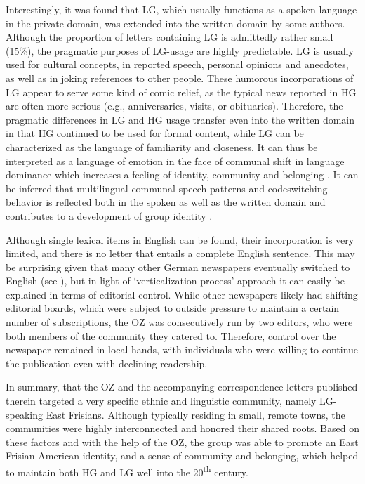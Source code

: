 \documentclass[output=paper]{langsci/langscibook}
\begin{document}
 
Interestingly, it was found that LG, which usually functions as a spoken language in the private domain, was extended into the written domain by some authors. Although the proportion of letters containing LG is admittedly rather small (15\%), the pragmatic purposes of LG-usage are highly predictable. LG is usually used for cultural concepts, in reported speech, personal opinions and anecdotes, as well as in joking references to other people. These humorous incorporations of LG appear to serve some kind of comic relief, as the typical news reported in HG are often more serious (e.g., anniversaries, visits, or obituaries). Therefore, the pragmatic differences in LG and HG usage transfer even into the written domain in that HG continued to be used for formal content, while LG can be characterized as the language of familiarity and closeness. It can thus be interpreted as a language of emotion in the face of communal shift in language dominance which increases a feeling of identity, community and belonging \citep{Pavlenko2002}. It can be inferred that multilingual communal speech patterns and codeswitching behavior is reflected both in the spoken as well as the written domain and contributes to a development of group identity .%
 

 
Although single lexical items in English can be found, their incorporation is very limited, and there is no letter that entails a complete English sentence. This may be surprising given that many other German newspapers eventually switched to English (see ), but in light of  ‘verticalization process’ approach it can easily be explained in terms of editorial control. While other newspapers likely had shifting editorial boards, which were subject to outside pressure to maintain a certain number of subscriptions, the OZ was consecutively run by two editors, who were both members of the community they catered to. Therefore, control over the newspaper remained in local hands, with individuals who were willing to continue the publication even with declining readership. 
 
 
In summary, that the OZ and the accompanying correspondence letters published therein targeted a very specific ethnic and linguistic community, namely LG-speaking East Frisians. Although typically residing in small, remote towns, the communities were highly interconnected and honored their shared roots. Based on these factors and with the help of the OZ, the group was able to promote an East Frisian-American identity, and a sense of community and belonging, which helped to maintain both HG and LG well into the 20\textsuperscript{th} century. 
\end{document}
